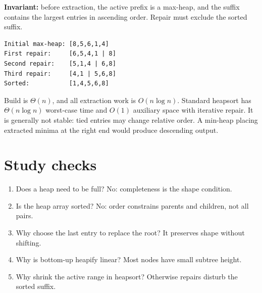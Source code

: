 \documentclass[11pt,letterpaper]{article}
\begin{document}
\textbf{Invariant:} before extraction, the active prefix is a max-heap, and the suffix contains the largest entries in ascending order. Repair must exclude the sorted suffix.
\par\noindent\begin{minipage}{\linewidth}
\begin{lstlisting}
Initial max-heap: [8,5,6,1,4]
First repair:     [6,5,4,1 | 8]
Second repair:    [5,1,4 | 6,8]
Third repair:     [4,1 | 5,6,8]
Sorted:           [1,4,5,6,8]
\end{lstlisting}
\end{minipage}\par
Build is $\Theta(n)$, and all extraction work is $O(n\log n)$. Standard heapsort has $\Theta(n\log n)$ worst-case time and $O(1)$ auxiliary space with iterative repair. It is generally not stable: tied entries may change relative order. A min-heap placing extracted minima at the right end would produce descending output.

\section{Study checks}
\begin{enumerate}
\item Does a heap need to be full? No: completeness is the shape condition.
\item Is the heap array sorted? No: order constrains parents and children, not all pairs.
\item Why choose the last entry to replace the root? It preserves shape without shifting.
\item Why is bottom-up heapify linear? Most nodes have small subtree height.
\item Why shrink the active range in heapsort? Otherwise repairs disturb the sorted suffix.
\end{enumerate}
\end{document}
